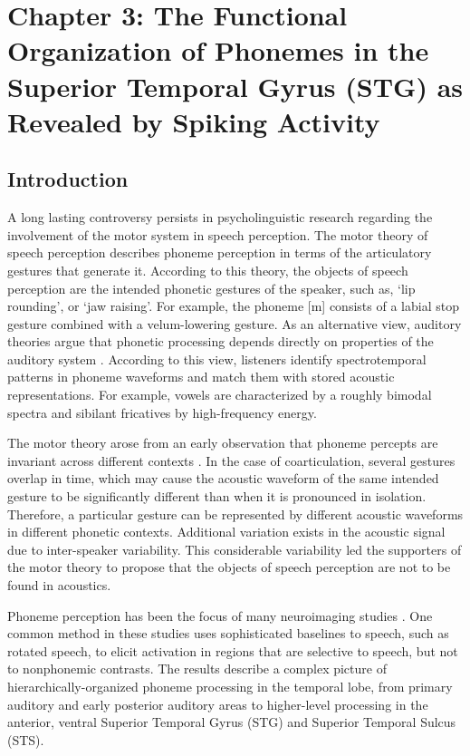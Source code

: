 \chapter{Chapter 3: The Functional Organization of Phonemes in the Superior Temporal Gyrus (STG) as Revealed by Spiking Activity}

\section{Introduction}
A long lasting controversy persists in psycholinguistic research regarding the involvement of the motor system in speech perception. The motor theory of speech perception \citep{liberman1967perception, liberman1985motor} describes phoneme perception in terms of the articulatory gestures that generate it. According to this theory, the objects of speech perception are the intended phonetic gestures of the speaker, such as, ‘lip rounding’, or ‘jaw raising’. For example, the phoneme [m] consists of a labial stop gesture combined with a velum-lowering gesture. As an alternative view, auditory theories argue that phonetic processing depends directly on properties of the auditory system \citep{jakobson1951preliminaries, stevens1972quantal, stevens1989quantal, stevens2002toward}. According to this view, listeners identify spectrotemporal patterns in phoneme waveforms and match them with stored acoustic representations. For example, vowels are characterized by a roughly bimodal spectra and sibilant fricatives by high-frequency energy.

The motor theory arose from an early observation that phoneme percepts are invariant across different contexts \citep{cooper1952some, liberman1967perception}. In the case of coarticulation, several gestures overlap in time, which may cause the acoustic waveform of the same intended gesture to be significantly different than when it is pronounced in isolation. Therefore, a particular gesture can be represented by different acoustic waveforms in different phonetic contexts. Additional variation exists in the acoustic signal due to inter-speaker variability.  This considerable variability led the supporters of the motor theory to propose that the objects of speech perception are not to be found in acoustics.

Phoneme perception has been the focus of many neuroimaging studies \citep{liebenthal2005neural, dehaene2005neural, mottonen2006perceiving, desai2008left, liebenthal2010specialization,  formisano2008saying, binder2000human, Dewitt2012}. One common method in these studies uses sophisticated baselines to speech, such as rotated speech, to elicit activation in regions that are selective to speech, but not to nonphonemic contrasts. The results describe a complex picture of hierarchically-organized phoneme processing in the temporal lobe, from primary auditory and early posterior auditory areas to higher-level processing in the anterior, ventral Superior Temporal Gyrus (STG) and Superior Temporal Sulcus (STS). 

